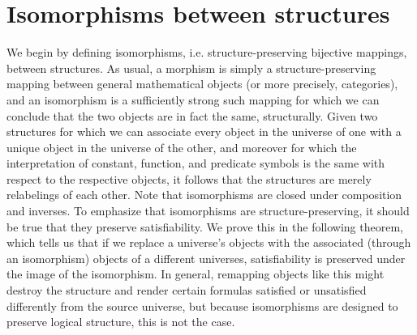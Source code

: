 \documentclass{article}
\begin{document}
\section{Isomorphisms between structures}
We begin by defining isomorphisms, i.e. structure-preserving bijective mappings, between structures.
As usual, a morphism is simply a structure-preserving mapping between general mathematical objects (or more precisely, categories), and an isomorphism is a sufficiently strong such mapping for which we can conclude that the two objects are in fact the same, structurally. Given two structures for which we can associate every object in the universe of one with a unique object in the universe of the other, and moreover for which the interpretation of constant, function, and predicate symbols is the same with respect to the respective objects, it follows that the structures are merely relabelings of each other. Note that isomorphisms are closed under composition and inverses.
\nn
To emphasize that isomorphisms are structure-preserving, it should be true that they preserve satisfiability. We prove this in the following theorem, which tells us that if we replace a universe's objects with the associated (through an isomorphism) objects of a different universes, satisfiability is preserved under the image of the isomorphism. In general, remapping objects like this might destroy the structure and render certain formulas satisfied or unsatisfied differently from the source universe, but because isomorphisms are designed to preserve logical structure, this is not the case.
\end{document}
